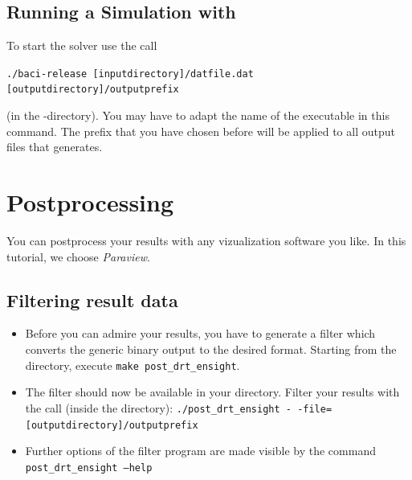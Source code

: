 \subsection{Running a Simulation with \baci{}}
\label{tut_fluid_preexo:baci}
To start the solver use the call 
\begin{center}
	\verb|./baci-release [inputdirectory]/datfile.dat [outputdirectory]/outputprefix|
\end{center}
(in the \baci{}-directory). You may have to adapt the name of the executable 
in this command. The prefix that you have chosen before will 
be applied to all output files that \baci{} generates.


\section{Postprocessing}

You can postprocess your results with any vizualization software you like. In this tutorial, we choose \emph{Paraview}. 

\subsection{Filtering result data}
\begin{itemize}
\item Before you can admire your results, you have to generate a filter 
which converts the generic binary \baci{} output to the desired format.
Starting from the \baci{} directory, execute \texttt{make post\_drt\_ensight}.
\item The filter should now be available in your \baci{} directory. Filter your results with
the call (inside the \baci{} directory): \texttt{./post\_drt\_ensight -\,-file=[outputdirectory]/outputprefix} 
\item Further options of the filter program are made visible by the command \texttt{post\_drt\_ensight --help}
\end{itemize}

